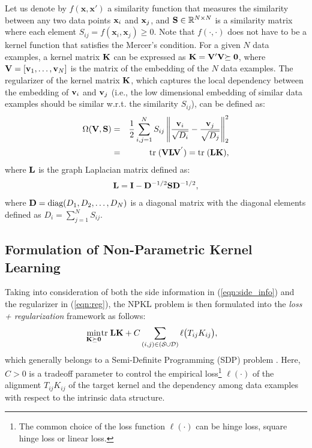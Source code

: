 Let us denote by $f(\mathbf{x}, \mathbf{x}')$ a similarity function that measures the
similarity between any two data points $\x_i$ and $\x_j$, and $\S \in
\mathbb{R}^{N\times N}$ is a similarity matrix where each element $S_{ij} =
f(\mathbf{x}_i, \mathbf{x}_j)\geq 0$. Note that $f(\cdot, \cdot)$ does not have to be
a kernel function that satisfies the Mercer's condition. For a given $N$ data examples, a kernel matrix $\K$
 can be expressed as $\K=\V'\V\psd$, where
$\V=[\v_1,\ldots,\v_N]$ is the matrix of the embedding of the $N$ data examples.
The regularizer of the kernel matrix $\K$, which captures the local dependency
between the embedding of $\v_i$ and $\v_j$ (i.e., the low dimensional embedding of similar data examples should be similar w.r.t. the similarity $S_{ij}$),
can be
defined as:
\begin{eqnarray}
\Omega(\V, \S)&=& \frac{1}{2}\sum_{i,j=1}^N {S_{ij}}
\left\|\frac{\mathbf{v}_i}{\sqrt{D_i}} - \frac{\mathbf{v}_j}{\sqrt{D_j}}\right\|_2^2\nonumber\\
&=&\tr(\V\L\V^{'})=\tr(\L\K),\label{eqn:reg}
\end{eqnarray}
where $\L$ is the graph Laplacian matrix defined as:
\begin{eqnarray}\label{eqn:laplace}
\L  =  \I - \D^{-1/2}\S\D^{-1/2},
\end{eqnarray}
where $\D = \mbox{diag}(D_1, D_2, \ldots, D_N)$ is a diagonal matrix with the
diagonal elements defined as $D_i = \sum_{j=1}^N S_{ij}$.


\subsection{Formulation of Non-Parametric Kernel Learning}

Taking into consideration of both the side
information in (\ref{eqn:side_info}) and the regularizer in (\ref{eqn:reg}), the NPKL
problem is then  formulated into the {\em loss + regularization} framework \cite{icml/HoiJL07} as
follows:
\begin{eqnarray}
\min_{\K\psd} & \tr \L\K  + C\sum_{(i,j) \in (\SS\cup\DD)}\ell\big(T_{ij}K_{ij}\big),
\label{eqn:ori-npk-obj}
\end{eqnarray}
which generally belongs to a Semi-Definite Programming (SDP)
problem \cite{Boyd}. Here, $C>0$ is a tradeoff parameter to control the
empirical loss\footnote{The common choice of the loss function $\ell(\cdot)$ can be
hinge loss, square hinge loss or linear loss. } $\ell(\cdot)$ of the alignment
$T_{ij}K_{ij}$ of the target kernel and the dependency among data examples with
respect to the intrinsic data structure.


